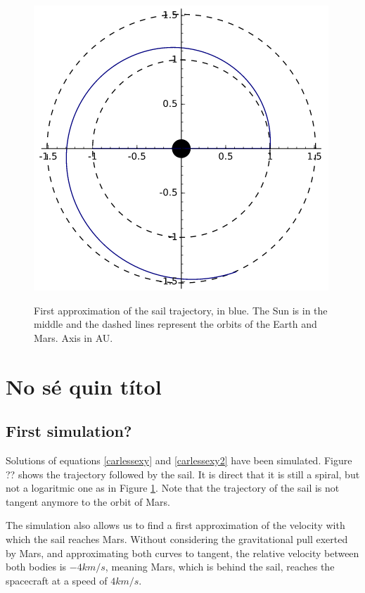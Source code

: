 \documentclass[twocolumn,12pt,a4paper]{article}
\numberwithin{equation}{section}
\begin{document}
\begin{figure}[h]
	\centering
	\includegraphics[scale=0.5]{espiral.png}
	\label{espiral}
	\caption{\small First approximation of the sail trajectory, in blue. The Sun is in the middle and the dashed lines represent the orbits of the Earth and Mars. Axis in AU.}

\end{figure}


\section{No sé quin títol}
\subsection{First simulation?}
Solutions of equations \ref{carlessexy} and \ref{carlessexy2} have been simulated. Figure ?? shows the trajectory followed by the sail. It is direct that it is still a spiral, but not a logaritmic one as in Figure \ref{espiral}. Note that the trajectory of the sail is not tangent anymore to the orbit of Mars.

The simulation also allows us to find a first approximation of the velocity with which the sail reaches Mars. Without considering the gravitational pull exerted by Mars, and approximating both curves to tangent, the relative velocity between both bodies is $-4km/s$, meaning Mars, which is behind the sail, reaches the spacecraft at a speed of $4km/s$.




\end{document}
